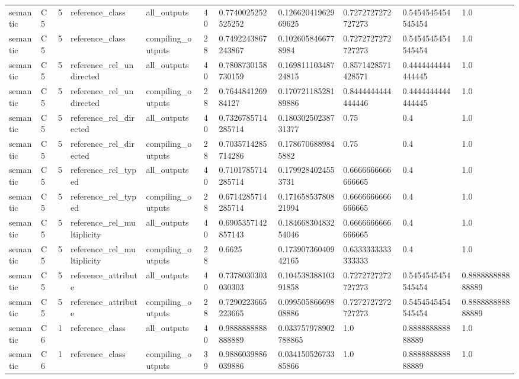 \begin{tabular}{lllllllllll}
semantic & C5 & 5 & reference\_class & all\_outputs & 40 & 0.7740025252525252 & 0.12662041962969625 & 0.7272727272727273 & 0.5454545454545454 & 1.0 \\
semantic & C5 & 5 & reference\_class & compiling\_outputs & 28 & 0.7492243867243867 & 0.1026058466778984 & 0.7272727272727273 & 0.5454545454545454 & 1.0 \\
semantic & C5 & 5 & reference\_rel\_undirected & all\_outputs & 40 & 0.7808730158730159 & 0.16981110348724815 & 0.8571428571428571 & 0.4444444444444445 & 1.0 \\
semantic & C5 & 5 & reference\_rel\_undirected & compiling\_outputs & 28 & 0.764484126984127 & 0.17072118528189886 & 0.8444444444444446 & 0.4444444444444445 & 1.0 \\
semantic & C5 & 5 & reference\_rel\_directed & all\_outputs & 40 & 0.7326785714285714 & 0.18030250238731377 & 0.75 & 0.4 & 1.0 \\
semantic & C5 & 5 & reference\_rel\_directed & compiling\_outputs & 28 & 0.7035714285714286 & 0.1786706889845882 & 0.75 & 0.4 & 1.0 \\
semantic & C5 & 5 & reference\_rel\_typed & all\_outputs & 40 & 0.7101785714285714 & 0.1799284024553731 & 0.6666666666666665 & 0.4 & 1.0 \\
semantic & C5 & 5 & reference\_rel\_typed & compiling\_outputs & 28 & 0.6714285714285714 & 0.17165853780821994 & 0.6666666666666665 & 0.4 & 1.0 \\
semantic & C5 & 5 & reference\_rel\_multiplicity & all\_outputs & 40 & 0.6905357142857143 & 0.18466830483254046 & 0.6666666666666665 & 0.4 & 1.0 \\
semantic & C5 & 5 & reference\_rel\_multiplicity & compiling\_outputs & 28 & 0.6625 & 0.17390736040942165 & 0.6333333333333333 & 0.4 & 1.0 \\
semantic & C5 & 5 & reference\_attribute & all\_outputs & 40 & 0.7378030303030303 & 0.10453838810391858 & 0.7272727272727273 & 0.5454545454545454 & 0.888888888888889 \\
semantic & C5 & 5 & reference\_attribute & compiling\_outputs & 28 & 0.7290223665223665 & 0.09950586669808886 & 0.7272727272727273 & 0.5454545454545454 & 0.888888888888889 \\
semantic & C6 & 1 & reference\_class & all\_outputs & 40 & 0.9888888888888889 & 0.033757978902788865 & 1.0 & 0.888888888888889 & 1.0 \\
semantic & C6 & 1 & reference\_class & compiling\_outputs & 39 & 0.9886039886039886 & 0.03415052673385866 & 1.0 & 0.888888888888889 & 1.0 \\

\end{tabular}
